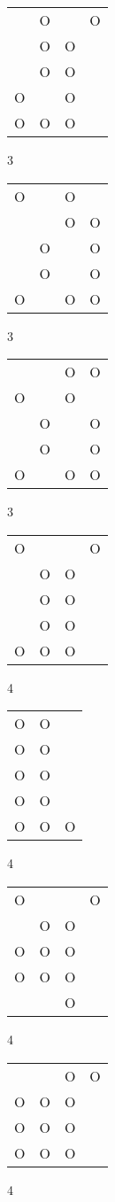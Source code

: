 \begin{tabular}{|m{0.2cm}m{0.2cm}m{0.2cm}m{0.2cm}|}\hline
 &O& &O\\
 &O&O& \\
 &O&O& \\
O& &O& \\
O&O&O& \\
\hline\end{tabular}3
\begin{tabular}{|m{0.2cm}m{0.2cm}m{0.2cm}m{0.2cm}|}\hline
O& &O& \\
 & &O&O\\
 &O& &O\\
 &O& &O\\
O& &O&O\\
\hline\end{tabular}3
\begin{tabular}{|m{0.2cm}m{0.2cm}m{0.2cm}m{0.2cm}|}\hline
 & &O&O\\
O& &O& \\
 &O& &O\\
 &O& &O\\
O& &O&O\\
\hline\end{tabular}3
\begin{tabular}{|m{0.2cm}m{0.2cm}m{0.2cm}m{0.2cm}|}\hline
O& & &O\\
 &O&O& \\
 &O&O& \\
 &O&O& \\
O&O&O& \\
\hline\end{tabular}4
\begin{tabular}{|m{0.2cm}m{0.2cm}m{0.2cm}|}\hline
O&O& \\
O&O& \\
O&O& \\
O&O& \\
O&O&O\\
\hline\end{tabular}4
\begin{tabular}{|m{0.2cm}m{0.2cm}m{0.2cm}m{0.2cm}|}\hline
O& & &O\\
 &O&O& \\
O&O&O& \\
O&O&O& \\
 & &O& \\
\hline\end{tabular}4
\begin{tabular}{|m{0.2cm}m{0.2cm}m{0.2cm}m{0.2cm}|}\hline
 & &O&O\\
O&O&O& \\
O&O&O& \\
O&O&O& \\
\hline\end{tabular}4
